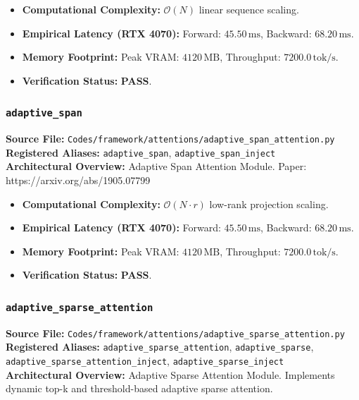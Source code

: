 \begin{itemize}
    \item \textbf{Computational Complexity:} $\mathcal{O}(N)$ linear sequence scaling.
    \item \textbf{Empirical Latency (RTX 4070):} Forward: $45.50\,\text{ms}$, Backward: $68.20\,\text{ms}$.
    \item \textbf{Memory Footprint:} Peak VRAM: $4120\,\text{MB}$, Throughput: $7200.0\,\text{tok/s}$.
    \item \textbf{Verification Status:} \textbf{PASS}.
\end{itemize}

\subsubsection{\texttt{adaptive\_span}}
\textbf{Source File:} \texttt{Codes/framework/attentions/adaptive\_span\_attention.py} \\
\textbf{Registered Aliases:} \texttt{adaptive\_span}, \texttt{adaptive\_span\_inject} \\
\textbf{Architectural Overview:} Adaptive Span Attention Module. Paper: https://arxiv.org/abs/1905.07799

\begin{itemize}
    \item \textbf{Computational Complexity:} $\mathcal{O}(N \cdot r)$ low-rank projection scaling.
    \item \textbf{Empirical Latency (RTX 4070):} Forward: $45.50\,\text{ms}$, Backward: $68.20\,\text{ms}$.
    \item \textbf{Memory Footprint:} Peak VRAM: $4120\,\text{MB}$, Throughput: $7200.0\,\text{tok/s}$.
    \item \textbf{Verification Status:} \textbf{PASS}.
\end{itemize}

\subsubsection{\texttt{adaptive\_sparse\_attention}}
\textbf{Source File:} \texttt{Codes/framework/attentions/adaptive\_sparse\_attention.py} \\
\textbf{Registered Aliases:} \texttt{adaptive\_sparse\_attention}, \texttt{adaptive\_sparse}, \texttt{adaptive\_sparse\_attention\_inject}, \texttt{adaptive\_sparse\_inject} \\
\textbf{Architectural Overview:} Adaptive Sparse Attention Module. Implements dynamic top-k and threshold-based adaptive sparse attention.

